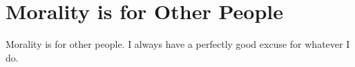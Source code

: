 \section{Morality is for Other People}

Morality is for other people. I always have a perfectly good excuse for whatever I do.



